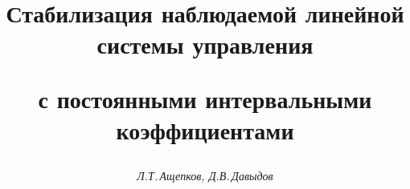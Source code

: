 









\newcommand{\rank}{\operatorname{rank}}


\newcommand{\tts}[1]{}


\renewcommand{\baselinestretch}{0.97}







\setcounter{page}{11}















\author{\it Л.Т.\,Ащепков, Д.В.\,Давыдов}




\title{Стабилизация наблюдаемой линейной системы управления


с постоянными интервальными коэффициентами}





\date{}




\pagestyle{plain} %







\maketitle


